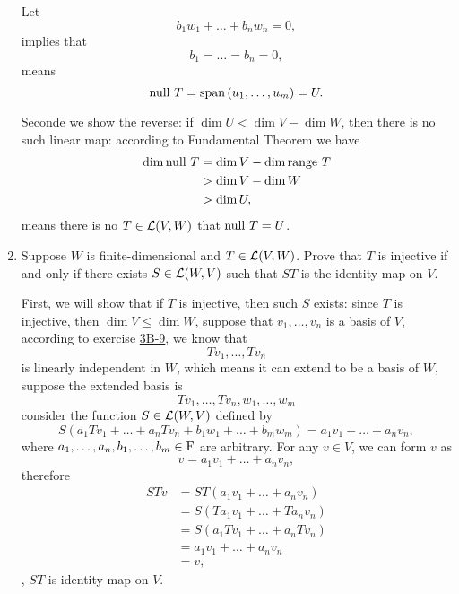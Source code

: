\begin{enumerate}
\begin{solution}
            Let 
            \[ b_1w_1 + \dots + b_nw_n = 0, \]
            implies that 
            \[ b_1 = \dots =b_n = 0,\]
            means 
            \[ \text{null}~T = \text{span}\left(u_1, \ldots, u_m\right) = U. \]

            Seconde we show the reverse: if $\dim{U} < \dim{V} - \dim{W}$, then there is no such linear map:
            according to Fundamental Theorem we have 
            \begin{align*}
                \dim{\text{null}~T} &= \dim{V} - \dim{\text{range}~T}\\
                               &> \dim{V} - \dim{W}\\
                               &> \dim{U},
            \end{align*}
            means there is no $T \in \mathcal{L}(V, W)$ that $\text{null}~T = U$.
        \end{solution}
    \item Suppose $W$ is finite-dimensional and $T \in \mathcal{L}(V, W)$. Prove that $T$ is injective if and only if there exists $S \in \mathcal{L}(W, V)$ 
        such that $ST$ is the identity map on $V$.
        \begin{solution}
            First, we will show that if $T$ is injective, then such $S$ exists: since $T$ is injective, then $\dim{V} \leq \dim{W}$, suppose that 
            $v_1, \ldots, v_n$ is a basis of $V$, according to exercise \hyperlink{3B-9}{3B-9}, we know that 
            \[ Tv_1, \ldots, Tv_n \]
            is linearly independent in $W$, which means it can extend to be a basis of $W$, suppose the extended basis is 
            \[ Tv_1, \ldots, Tv_n, w_1, \ldots, w_m \]
            consider the function $S \in \mathcal{L}(W, V)$ defined by 
            \[ S(a_1Tv_1 + \dots + a_nTv_n + b_1w_1 + \dots + b_mw_m) = a_1v_1 + \dots + a_nv_n ,\]
            where $a_1,\ldots, a_n,b_1,\ldots,b_m \in \mathrm{F}$ are arbitrary. For any $v \in V$, we can form $v$ as 
            \[ v = a_1v_1 + \dots + a_nv_n, \] 
            therefore 
            \begin{align*}
                STv &= ST(a_1v_1 + \dots + a_nv_n) \\
                    &= S(Ta_1v_1 + \dots + Ta_nv_n) \\
                    &= S(a_1Tv_1 + \dots + a_nTv_n) \\
                    &= a_1v_1 + \dots + a_nv_n \\
                    &= v,
            \end{align*}
            \ie, $ST$ is identity map on $V$.


\end{solution}
\end{enumerate}
